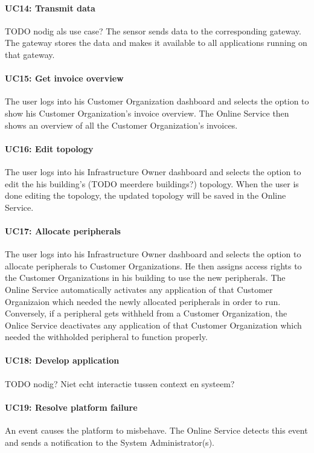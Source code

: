 \documentclass[english,peerreview]{sareport}
\begin{document}
\paragraph{UC14: Transmit data}
TODO nodig als use case?
The sensor sends data to the corresponding gateway. The gateway stores the data and makes it available to all applications running on that gateway.

\paragraph{UC15: Get invoice overview}
The user logs into his Customer Organization dashboard and selects the option to show his Customer Organization's invoice overview. The Online Service then shows an overview of all the Customer Organization's invoices.

\paragraph{UC16: Edit topology}
The user logs into his Infrastructure Owner dashboard and selects the option to edit the his building's (TODO meerdere buildings?) topology. When the user is done editing the topology, the updated topology will be saved in the Online Service.

\paragraph{UC17: Allocate peripherals}
The user logs into his Infrastructure Owner dashboard and selects the option to allocate peripherals to Customer Organizations. He then assigns access rights to the Customer Organizations in his building to use the new peripherals. The Online Service automatically activates any application of that Customer Organizaion which needed the newly allocated peripherals in order to run. Conversely, if a peripheral gets withheld from a Customer Organization, the Onlice Service deactivates any application of that Customer Organization which needed the withholded peripheral to function properly.

\paragraph{UC18: Develop application}
TODO nodig? Niet echt interactie tussen context en systeem?

\paragraph{UC19: Resolve platform failure}
An event causes the platform to misbehave. The Online Service detects this event and sends a notification to the System Administrator(s).
\end{document}
